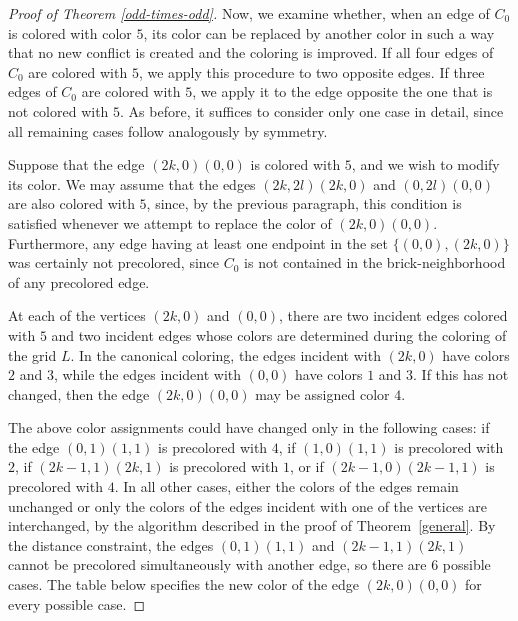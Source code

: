 \documentclass[a4paper,12pt]{article}
\begin{document}
\begin{proof}[Proof of Theorem \ref{odd-times-odd}]
    Now, we examine whether, when an edge of $C_0$ is colored with color $5$, its color can be replaced by another color in such a way that no new conflict is created and the coloring is improved. If all four edges of $C_0$ are colored with $5$, we apply this procedure to two opposite edges. If three edges of $C_0$ are colored with $5$, we apply it to the edge opposite the one that is not colored with $5$. As before, it suffices to consider only one case in detail, since all remaining cases follow analogously by symmetry.

    Suppose that the edge $(2k,0)(0,0)$ is colored with $5$, and we wish to modify its color. We may assume that the edges $(2k,2l)(2k,0)$ and $(0,2l)(0,0)$ are also colored with $5$, since, by the previous paragraph, this condition is satisfied whenever we attempt to replace the color of $(2k,0)(0,0)$. Furthermore, any edge having at least one endpoint in the set $\{(0,0), (2k,0)\}$ was certainly not precolored, since $C_0$ is not contained in the brick-neighborhood of any precolored edge.

    At each of the vertices $(2k,0)$ and $(0,0)$, there are two incident edges colored with $5$ and two incident edges whose colors are determined during the coloring of the grid $L$. In the canonical coloring, the edges incident with $(2k,0)$ have colors $2$ and $3$, while the edges incident with $(0,0)$ have colors $1$ and $3$. If this has not changed, then the edge $(2k,0)(0,0)$ may be assigned color $4$.

    The above color assignments could have changed only in the following cases: if the edge $(0,1)(1,1)$ is precolored with $4$, if $(1,0)(1,1)$ is precolored with $2$, if $(2k-1,1)(2k,1)$ is precolored with $1$, or if $(2k-1,0)(2k-1,1)$ is precolored with $4$. In all other cases, either the colors of the edges remain unchanged or only the colors of the edges incident with one of the vertices are interchanged, by the algorithm described in the proof of Theorem~\ref{general}. By the distance constraint, the edges $(0,1)(1,1)$ and $(2k-1,1)(2k,1)$ cannot be precolored simultaneously with another edge, so there are 6 possible cases. The table below specifies the new color of the edge $(2k,0)(0,0)$ for every possible case.



\end{proof}
\end{document}
